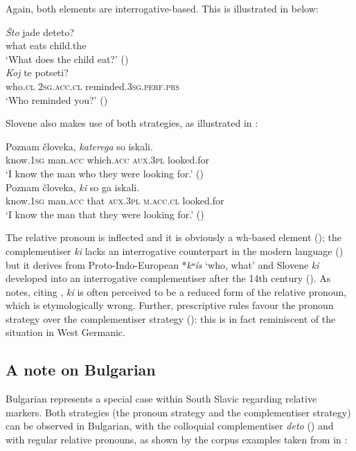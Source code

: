 \documentclass[output=paper]{langscibook}
\begin{document}
\noindent Again, both elements are interrogative-based. This is illustrated in  below:

\ea \label{bacsk:ex:intmac}
\ea \gll \textit{\v{S}to} jade deteto?\\
what eats child.the\\
\glt `What does the child eat?' \hfill (\citealt[134]{lazarovanikovska2003})\\
\ex \gll \textit{Koj} te potseti?\\
who.\textsc{cl} \textsc{2sg.acc.cl} reminded.\textsc{3sg.perf.prs}\\
\glt `Who reminded you?' \hfill (\citealt{tomic2006})
\z
\z

\noindent Slovene also makes use of both strategies, as illustrated in :

\ea \label{bacsk:ex:slovenedata}
\ea \gll Poznam človeka, \textit{katerega} so iskali.\\
know.\textsc{1sg} man.\textsc{acc} which.\textsc{acc} \textsc{aux.3pl} looked.for\\
\glt `I know the man who they were looking for.' \hfill (\citealt[10]{hladnik2010})\\
\ex \gll Poznam človeka, \textit{ki} so ga iskali.\\
know.\textsc{1sg} man.\textsc{acc} that \textsc{aux.3pl} \textsc{m.acc.cl} looked.for\\
\glt `I know the man that they were looking for.' \hfill (\citealt[10]{hladnik2010})
\z
\z

\noindent The relative pronoun is inflected and it is obviously a wh-based element (\citealt[225]{mitrovic2016}); the complementiser \textit{ki} lacks an interrogative counterpart in the modern language (\citealt[225]{mitrovic2016}) but it derives from Proto-Indo-European *\textit{kʷís} `who, what' and Slovene \textit{ki} developed into an interrogative complementiser after the 14th century (\citealt[225]{mitrovic2016}). As \citet[38]{hladnik2010} notes, citing \citet{cazinkic2001}, \textit{ki} is often perceived to be a reduced form of the relative pronoun, which is etymologically wrong. Further, prescriptive rules favour the pronoun strategy over the complementiser strategy (\citealt[38]{hladnik2010}): this is in fact reminiscent of the situation in West Germanic.

\subsection{A note on Bulgarian} \label{bacsk:sec:bulgarian}
Bulgarian represents a special case within South Slavic regarding relative markers. Both strategies (the pronoun strategy and the complementiser strategy) can be observed in Bulgarian, with the colloquial complementiser \textit{deto} (\citealt{rudin2014}) and with regular relative pronouns, as shown by the corpus examples taken from \citet{buzarovska2009} in :
\end{document}
